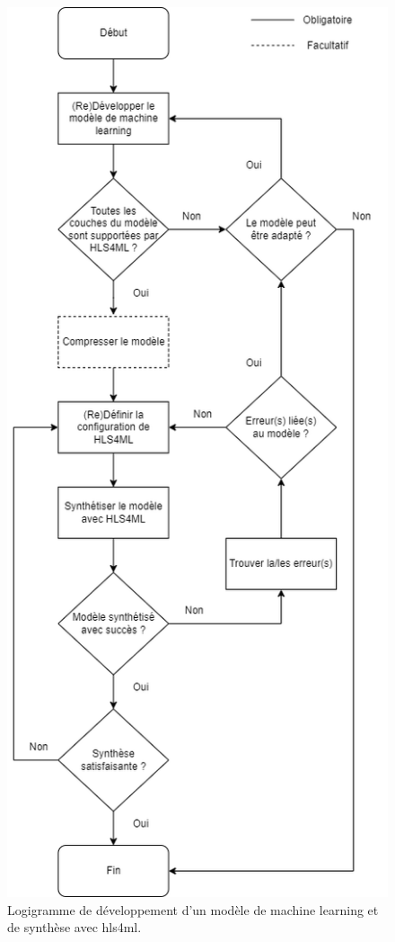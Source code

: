 \begin{figure}[hbt!]
    \centering
    \includegraphics[scale=0.56]{Figures/hls4ml/synthetize_model_with_hls4ml.png}
    \caption{Logigramme de développement d'un modèle de machine learning et de synthèse avec \acrshort{hls4ml}.}
    \label{fig:synthetize_model_with_hls4ml}
\end{figure}

